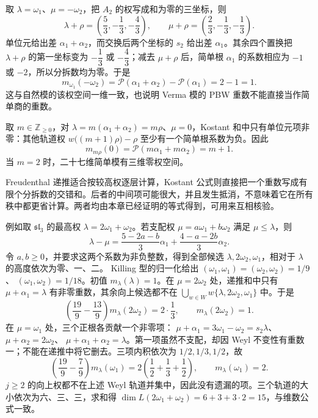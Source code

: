 \ProseParagraphBreak
取 \(\lambda=\omega_1\)、\(\mu=-\omega_2\)，把 \(A_2\) 的权写成和为零的三坐标，则
\[
	\lambda+\rho=\left(\frac53,-\frac13,-\frac43\right),\qquad \mu+\rho=\left(\frac23,-\frac13,-\frac13\right).
\]
单位元给出差 \(\alpha_1+\alpha_2\)，而交换后两个坐标的 \(s_2\) 给出差 \(\alpha_1\)。其余四个置换把 \(\lambda+\rho\) 的第一坐标变为 \(-\dfrac13\) 或 \(-\dfrac43\)；减去 \(\mu+\rho\) 后，简单根 \(\alpha_1\) 的系数相应为 \(-1\) 或 \(-2\)，所以分拆数均为零。于是
\[
	m_{\omega_1}(-\omega_2) =\mathcal P(\alpha_1+\alpha_2)-\mathcal P(\alpha_1) =2-1=1.
\]
这与自然模的该权空间一维一致，也说明 Verma 模的 PBW 重数不能直接当作简单商的重数。

\ProseParagraphBreak
取 \(m\in\mathbb Z_{\ge0}\)，对 \(\lambda=m(\alpha_1+\alpha_2)=m\rho\)、\(\mu=0\)，Kostant 和中只有单位元项非零：其他轨道权 \(w\bigl((m+1)\rho\bigr)-\rho\) 至少有一个简单根系数为负。因此
\[
	m_{m\rho}(0)=\mathcal P(m\alpha_1+m\alpha_2)=m+1.
\]
当 \(m=2\) 时，二十七维简单模有三维零权空间。

\ProseParagraphBreak
Freudenthal 递推适合按较高权逐层计算，Kostant 公式则直接把一个重数写成有限个分拆数的交错和。后者的中间项可能很大，并且发生抵消，不意味着它在所有秩中都更省计算。两者均由本章已经证明的等式得到，可用来互相核验。

\ProseParagraphBreak
例如取 \(\mathfrak{sl}_3\) 的最高权 \(\lambda=2\omega_1+\omega_2\)。若支配权 \(\mu=a\omega_1+b\omega_2\) 满足 \(\mu\le\lambda\)，则
\[
	\lambda-\mu =\frac{5-2a-b}{3}\alpha_1+\frac{4-a-2b}{3}\alpha_2.
\]
令 \(a,b\ge0\)，并要求这两个系数为非负整数，得到全部候选 \(\lambda,2\omega_2,\omega_1\)，相对于 \(\lambda\) 的高度依次为零、一、二。 Killing 型的归一化给出 \((\omega_1,\omega_1)=(\omega_2,\omega_2)=1/9\)、 \((\omega_1,\omega_2)=1/18\)。初值 \(m_\lambda(\lambda)=1\)。在 \(\mu=2\omega_2\) 处，递推和中只有 \(\mu+\alpha_1=\lambda\) 有非零重数，其余向上候选都不在 \(\bigcup_{w\in W}w\{\lambda,2\omega_2,\omega_1\}\) 中。于是
\[
	\left(\frac{19}{9}-\frac{13}{9}\right)m_\lambda(2\omega_2) =2\cdot\frac13, \qquad m_\lambda(2\omega_2)=1.
\]
在 \(\mu=\omega_1\) 处，三个正根各贡献一个非零项： \(\mu+\alpha_1=3\omega_1-\omega_2=s_2\lambda\)、 \(\mu+\alpha_2=2\omega_2\)、 \(\mu+\alpha_1+\alpha_2=\lambda\)。第一项虽然不支配，却因 Weyl 不变性有重数一；不能在递推中将它删去。三项内积依次为 \(1/2,1/3,1/2\)，故
\[
	\left(\frac{19}{9}-\frac79\right)m_\lambda(\omega_1) =2\left(\frac12+\frac13+\frac12\right), \qquad m_\lambda(\omega_1)=2.
\]
\(j\ge2\) 的向上权都不在上述 Weyl 轨道并集中，因此没有遗漏的项。三个轨道的大小依次为六、三、三，求和得 \(\dim L(2\omega_1+\omega_2)=6+3+3\cdot2=15\)，与维数公式一致。

